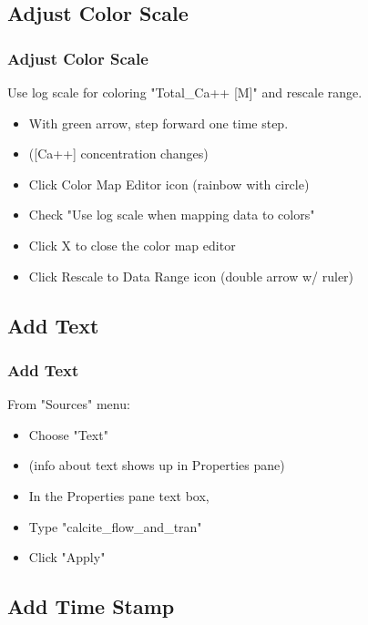 \documentclass{beamer}
\begin{document}
\subsection{Adjust Color Scale}

\begin{frame}[fragile]\frametitle{Adjust Color Scale}
Use log scale for coloring "Total\_Ca++ [M]" and rescale range.

\begin{itemize}
  \item With green arrow, step forward one time step.
  \item ([Ca++] concentration changes)
  \item Click Color Map Editor icon (rainbow with circle)
  \item Check "Use log scale when mapping data to colors"
  \item Click X to close the color map editor
  \item Click Rescale to Data Range icon (double arrow w/ ruler)
\end{itemize}

\end{frame}

\subsection{Add Text}

\begin{frame}[fragile]\frametitle{Add Text}
From "Sources" menu:

\begin{itemize}
  \item Choose "Text"
  \item (info about text shows up in Properties pane)
  \item In the Properties pane text box,
  \item Type "calcite\_flow\_and\_tran"
  \item Click "Apply"
\end{itemize}

\end{frame}

\subsection{Add Time Stamp}
\end{document}
